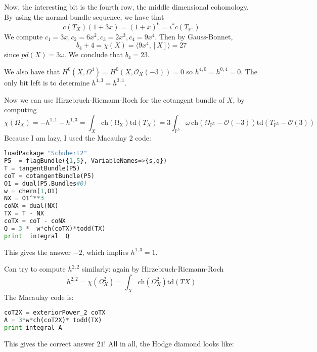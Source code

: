 Now, the interesting bit is the fourth row, the middle dimensional cohomology. By using the normal bundle sequence, we have that $$c(T_{X})(1+3x)=(1+x)^6=\iota^* c(T_{\mathbb{P}^5})$$We compute $c_1=3x, c_2=6x^2, c_3=2x^3, c_4=9x^4$. Then by Gauss-Bonnet, $$b_{4}+4=\chi(X)=\langle 9x^4, [X] \rangle= 27 $$since $pd(X)=3\omega$. We conclude that $b_4=23$. 

We also have that $H^0(X, \Omega^4)=H^0(X, \mathcal{O}_{X}(-3))=0$ so $h^{4,0}=h^{0,4}=0$. The only bit left is to determine $h^{1,3}=h^{3,1}$. 

Now we can use Hirzebruch-Riemann-Roch for the cotangent bundle of $X$, by computing $$\chi(\Omega_{X})=-h^{1,1}-h^{1,3}=\int _{X}\mathrm{ch(\Omega_{X})}\mathrm{td}(T_{X})=3\int _{\mathbb{P}^5} \omega \,\mathrm{ch}(\Omega_{\mathbb{P}^5}-\mathcal{O}(-3)) \mathrm{td}(T_{\mathbb{P}^5}-\mathcal{O}(3))  $$
Because I am lazy, I used the Macaulay 2 code: 

\begin{lstlisting}[language=Python]
loadPackage "Schubert2"
P5  = flagBundle({1,5}, VariableNames=>{s,q})
T = tangentBundle(P5)
coT = cotangentBundle(P5)
O1 = dual(P5.Bundles#0)
w = chern(1,O1)
NX = O1^**3
coNX = dual(NX)
TX = T - NX
coTX = coT - coNX
Q = 3 *  w*ch(coTX)*todd(TX)
print  integral  Q
\end{lstlisting}
This gives the answer $-2$, which implies $h^{1,3}=1$.

Can try to compute $h^{2,2}$ similarly: again by Hirzebruch-Riemann-Roch
$$h^{2,2}=\chi(\Omega_{X}^2)=\int_{X} \mathrm{ch}(\Omega^2_{X})\mathrm{td}(TX)  $$
The Macaulay code is: 

\begin{lstlisting}[language=Python] 
coT2X = exteriorPower_2 coTX
A = 3*w*ch(coT2X)* todd(TX)
print integral A
\end{lstlisting}
This gives the correct answer $21$! All in all, the Hodge diamond looks like: 

\begin{center}
\end{center}

